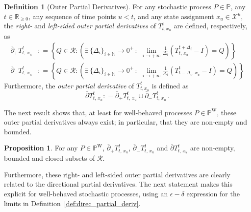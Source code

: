 \documentclass[10pt]{paper}
\theoremstyle{definition}
\newtheorem{proposition}[theorem]{Proposition}
\newtheorem{definition}{Definition}
\newcommand{\nats}{\mathbb{N}}
\newcommand{\reals}{\mathbb{R}}
\newcommand{\realsnonneg}{\reals_{\geq 0}}
\newcommand{\states}{\mathcal{X}}
\newcommand{\processes}{\mathbb{P}}
\newcommand{\wprocesses}{\processes^{\mathrm{W}}}
\newcommand{\coloneqq}{:\!=}
\begin{document}
\begin{definition}[Outer Partial Derivatives]
For any stochastic process $P\in\processes$, any $t\in\realsnonneg$, any sequence of time points $u<t$, and any state assignment $x_u\in\states^u$, the \emph{right-} and \emph{left-sided} \emph{outer partial derivatives} of $T_{t,x_u}^t$ are defined, respectively, as
\begin{align}
\overline{\partial}_{+}
{T^t_{t,\,x_u}}
&\coloneqq
\left\{
Q\in\mathcal{R}
\colon
\left(\exists \,\{\Delta_i\}_{i\in\nats}\to0^+\,:\,
~
\lim_{i\to+\infty}
\frac{1}{\Delta_i}
(T^{t+\Delta_i}_{t,\,x_u}-I)
=Q
\right)
\right\}\label{eq:rightouterderivative}\\
\overline{\partial}_{-}
{T^t_{t,\,x_u}}
&\coloneqq
\left\{
Q\in\mathcal{R}
\colon
\left(\exists\, \{\Delta_i\}_{i\in\nats}\to0^+\,:\,
~
\lim_{i\to+\infty}
\frac{1}{\Delta_i}
(T^{t}_{t-\Delta_i,\,x_u}-I)
=Q
\right)\label{eq:leftouterderivative}
\right\}
\end{align}
Furthermore, the \emph{outer partial derivative} of $T_{t,x_u}^t$ is defined as
\begin{equation*}
\overline{\partial}
{T^t_{t,\,x_u}}
\coloneqq
\overline{\partial}_{+}
{T^t_{t,\,x_u}}
\cup
\overline{\partial}_{-}
{T^t_{t,\,x_u}}\,.
\end{equation*}
\end{definition}

The next result shows that, at least for well-behaved processes $P\in\wprocesses$, these outer partial derivatives always exist; in particular, that they are non-empty and bounded.

\begin{proposition}\label{prop:boundednon-emptyandclosed}
For any $P\in\wprocesses$, $\overline{\partial}_{+}
{T^t_{t,\,x_u}}$, $\overline{\partial}_{-}
{T^t_{t,\,x_u}}$ and $\overline{\partial}
{T^t_{t,\,x_u}}$ are non-empty, bounded and closed subsets of $\mathcal{R}$.
\end{proposition}

\noindent Furthermore, these right- and left-sided outer partial derivatives are clearly related to the directional partial derivatives. The next statement makes this explicit for well-behaved stochastic processes, using an $\epsilon-\delta$ expression for the limits in Definition~\ref{def:direc_partial_deriv}.
\end{document}
